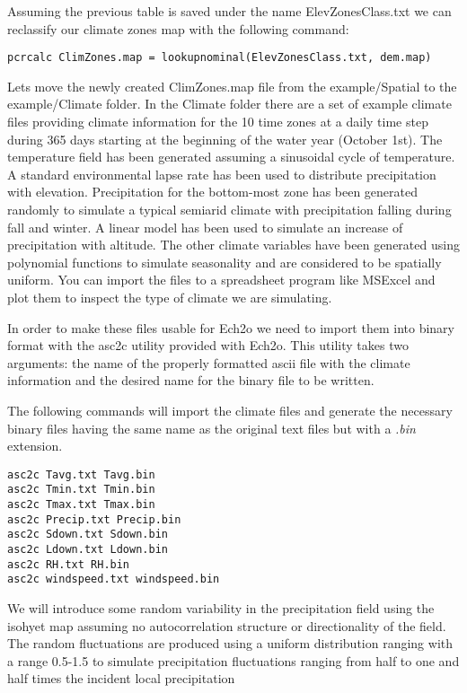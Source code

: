 Assuming the previous table is saved under the name \textsf{ElevZonesClass.txt} we can reclassify our climate zones map with the following command:

\begin{verbatim}
pcrcalc ClimZones.map = lookupnominal(ElevZonesClass.txt, dem.map)
\end{verbatim}
 
Lets move the newly created \textsf{ClimZones.map} file from the \textsf{example/Spatial} to the \textsf{example/Climate} folder. In the \textsf{Climate} folder there are a set of example climate files providing climate information for the 10 time zones at a daily time step during 365 days starting at the beginning of the water year (October 1st). The temperature field has been generated assuming a sinusoidal cycle of temperature. A standard environmental lapse rate has been used to distribute precipitation with elevation. Precipitation for the bottom-most zone has been generated randomly to simulate a typical semiarid climate with precipitation falling during fall and winter. A linear model has been used to simulate an increase of precipitation with altitude. The other climate variables have been generated using polynomial functions to simulate seasonality and are considered to be spatially uniform. You can import the files to a spreadsheet program like MSExcel and plot them to inspect the type of climate we are simulating. 

In order to make these files usable for Ech2o we need to import them into binary format with the \textsf{asc2c} utility provided with Ech2o. This utility takes two arguments: the name of the properly formatted ascii file with the climate information and the desired name for the binary file to be written.

The following commands will import the climate files and generate the necessary binary files having the same name as the original text files but with a \textit{.bin} extension.

\begin{verbatim}
asc2c Tavg.txt Tavg.bin
asc2c Tmin.txt Tmin.bin
asc2c Tmax.txt Tmax.bin
asc2c Precip.txt Precip.bin
asc2c Sdown.txt Sdown.bin
asc2c Ldown.txt Ldown.bin
asc2c RH.txt RH.bin
asc2c windspeed.txt windspeed.bin
\end{verbatim} 

We will introduce some random variability in the precipitation field using the isohyet map assuming no autocorrelation structure or directionality of the field. The random fluctuations are produced using a uniform distribution ranging with a range 0.5-1.5 to simulate precipitation fluctuations ranging from half to one and half times the incident local precipitation 

